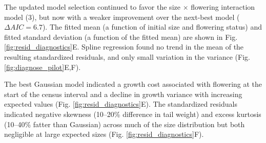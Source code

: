 \documentclass[12pt]{article}
\begin{document}
\begin{spacing}{1.9}
The updated model selection continued to favor the size $\times$ flowering interaction model (3), but now with a weaker improvement over the next-best model ($\Delta AIC = 6.7$). 
The fitted mean (a function of initial size and flowering status) and fitted standard deviation (a function of the fitted mean) are shown in Fig. \ref{fig:resid_diagnostics}E. 
Spline regression found no trend in the mean of the resulting standardized residuals, and only small variation in the variance (Fig. \ref{fig:diagnose_pilot}E,F).  

The best Gaussian model indicated a growth cost associated with flowering at the start of the census interval and a decline in growth variance with increasing expected values (Fig. \ref{fig:resid_diagnostics}E). 
The standardized residuals indicated negative skewness (10--20\% difference in tail weight) and excess kurtosis (10--40\% fatter than Gaussian) across much of the size distribution but both negligible at large expected sizes (Fig. \ref{fig:resid_diagnostics}F). 


\end{spacing}
\end{document}
